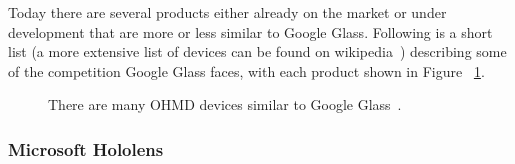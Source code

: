 Today there are several products either already on the market or under development that are more or less similar to Google Glass. Following is a short list (a more extensive list of devices can be found on wikipedia~\cite{ohmdWiki}) describing some of the competition Google Glass faces, with each product shown in Figure ~\ref{imagesSimilarProducts}. 

	\begin{figure}[H]%
		\centering
    \qquad
    \qquad
    \qquad
    \qquad
		\caption{There are many OHMD devices similar to Google Glass~\cite{ohmdWiki}.}
		\label{imagesSimilarProducts}
	\end{figure}
	

\subsubsection{Microsoft Hololens~\cite{hololens}}

